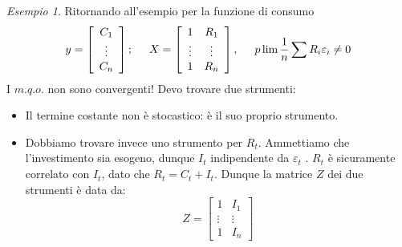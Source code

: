 \documentclass[a4paper]{report}
\newcounter{ese}
\theoremstyle{remark}
\newtheorem{esempio}[ese]{Esempio}
\newcounter{theor}
\begin{document}
\begin{esempio}
Ritornando all'esempio per la funzione di consumo%
\begin{equation*}
y=\left[ 
\begin{array}{c}
C_{1} \\ 
\vdots \\ 
C_{n}%
\end{array}%
\right] ;\hspace{0.5cm}X=\left[ 
\begin{array}{cc}
1 & R_{1} \\ 
\vdots & \vdots \\ 
1 & R_{n}%
\end{array}%
\right] ,\hspace{0.5cm}p\lim \frac{1}{n}\sum R_{i}\varepsilon _{i}\neq 0
\end{equation*}%
I $m.q.o.$ non sono convergenti! Devo trovare due strumenti:
\end{esempio}

\begin{itemize}
\item Il termine costante non \`{e} stocastico: \`{e} il suo proprio
strumento.

\item Dobbiamo trovare invece uno strumento per $R_{t}$. Ammettiamo che
l'investimento sia esogeno, dunque $I_{t}$ indipendente da $\varepsilon _{t}$%
. $R_{t}$ \`{e} sicuramente correlato con $I_{t}$, dato che $%
R_{t}=C_{t}+I_{t}$. Dunque la matrice $Z$ dei due strumenti \`{e} data da: 
\begin{equation*}
Z=\left[ 
\begin{array}{cc}
1 & I_{1} \\ 
\vdots & \vdots \\ 
1 & I_{n}%
\end{array}%
\right]
\end{equation*}
\end{itemize}
\end{document}
